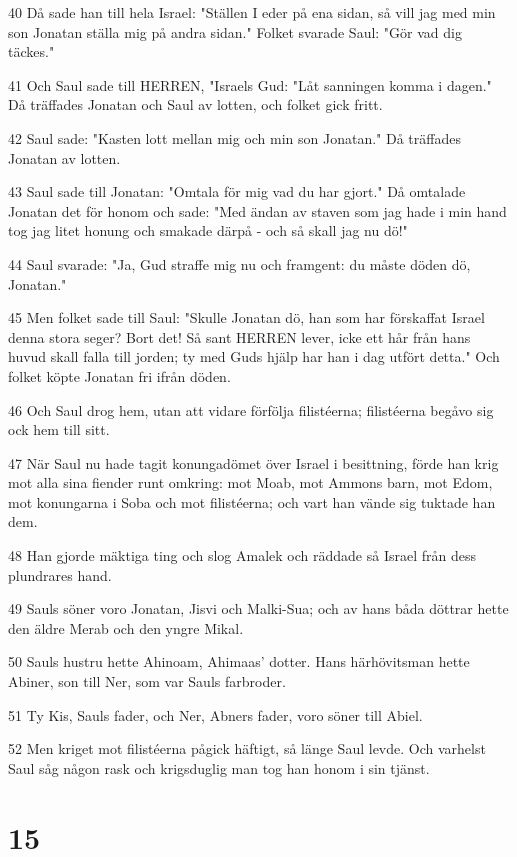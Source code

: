 \par 40 Då sade han till hela Israel: "Ställen I eder på ena sidan, så vill jag med min son Jonatan ställa mig på andra sidan." Folket svarade Saul: "Gör vad dig täckes."
\par 41 Och Saul sade till HERREN, "Israels Gud: "Låt sanningen komma i dagen." Då träffades Jonatan och Saul av lotten, och folket gick fritt.
\par 42 Saul sade: "Kasten lott mellan mig och min son Jonatan." Då träffades Jonatan av lotten.
\par 43 Saul sade till Jonatan: "Omtala för mig vad du har gjort." Då omtalade Jonatan det för honom och sade: "Med ändan av staven som jag hade i min hand tog jag litet honung och smakade därpå - och så skall jag nu dö!"
\par 44 Saul svarade: "Ja, Gud straffe mig nu och framgent: du måste döden dö, Jonatan."
\par 45 Men folket sade till Saul: "Skulle Jonatan dö, han som har förskaffat Israel denna stora seger? Bort det! Så sant HERREN lever, icke ett hår från hans huvud skall falla till jorden; ty med Guds hjälp har han i dag utfört detta." Och folket köpte Jonatan fri ifrån döden.
\par 46 Och Saul drog hem, utan att vidare förfölja filistéerna; filistéerna begåvo sig ock hem till sitt.
\par 47 När Saul nu hade tagit konungadömet över Israel i besittning, förde han krig mot alla sina fiender runt omkring: mot Moab, mot Ammons barn, mot Edom, mot konungarna i Soba och mot filistéerna; och vart han vände sig tuktade han dem.
\par 48 Han gjorde mäktiga ting och slog Amalek och räddade så Israel från dess plundrares hand.
\par 49 Sauls söner voro Jonatan, Jisvi och Malki-Sua; och av hans båda döttrar hette den äldre Merab och den yngre Mikal.
\par 50 Sauls hustru hette Ahinoam, Ahimaas' dotter. Hans härhövitsman hette Abiner, son till Ner, som var Sauls farbroder.
\par 51 Ty Kis, Sauls fader, och Ner, Abners fader, voro söner till Abiel.
\par 52 Men kriget mot filistéerna pågick häftigt, så länge Saul levde. Och varhelst Saul såg någon rask och krigsduglig man tog han honom i sin tjänst.

\chapter{15}

